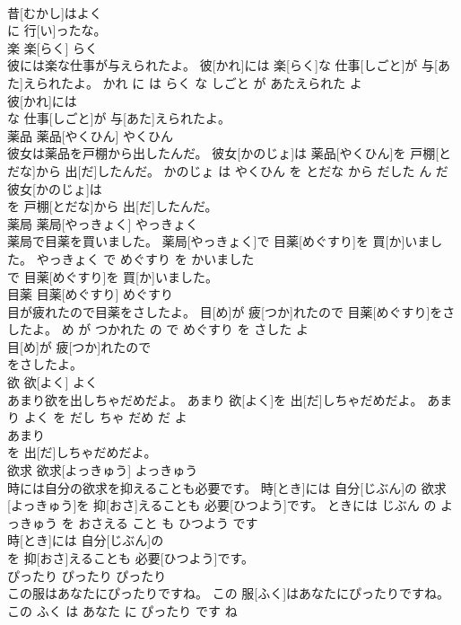 \documentclass[8pt]{extreport}
\begin{document}
\begin{CJK}{UTF8}{min}
\\	昔[むかし]はよく
\\	に 行[い]ったな。			
\\	楽	楽[らく]	らく	
\\	彼には楽な仕事が与えられたよ。	彼[かれ]には 楽[らく]な 仕事[しごと]が 与[あた]えられたよ。	かれ に は らく な しごと が あたえられた よ	
\\	彼[かれ]には
\\	な 仕事[しごと]が 与[あた]えられたよ。			
\\	薬品	薬品[やくひん]	やくひん	
\\	彼女は薬品を戸棚から出したんだ。	彼女[かのじょ]は 薬品[やくひん]を 戸棚[とだな]から 出[だ]したんだ。	かのじょ は やくひん を とだな から だした ん だ	
\\	彼女[かのじょ]は
\\	を 戸棚[とだな]から 出[だ]したんだ。			
\\	薬局	薬局[やっきょく]	やっきょく	
\\	薬局で目薬を買いました。	薬局[やっきょく]で 目薬[めぐすり]を 買[か]いました。	やっきょく で めぐすり を かいました	
\\	で 目薬[めぐすり]を 買[か]いました。			
\\	目薬	目薬[めぐすり]	めぐすり	
\\	目が疲れたので目薬をさしたよ。	目[め]が 疲[つか]れたので 目薬[めぐすり]をさしたよ。	め が つかれた の で めぐすり を さした よ	
\\	目[め]が 疲[つか]れたので
\\	をさしたよ。			
\\	欲	欲[よく]	よく	
\\	あまり欲を出しちゃだめだよ。	あまり 欲[よく]を 出[だ]しちゃだめだよ。	あまり よく を だし ちゃ だめ だ よ	
\\	あまり
\\	を 出[だ]しちゃだめだよ。			
\\	欲求	欲求[よっきゅう]	よっきゅう	
\\	時には自分の欲求を抑えることも必要です。	時[とき]には 自分[じぶん]の 欲求[よっきゅう]を 抑[おさ]えることも 必要[ひつよう]です。	ときには じぶん の よっきゅう を おさえる こと も ひつよう です	
\\	時[とき]には 自分[じぶん]の
\\	を 抑[おさ]えることも 必要[ひつよう]です。			
\\	ぴったり	ぴったり	ぴったり	
\\	この服はあなたにぴったりですね。	この 服[ふく]はあなたにぴったりですね。	この ふく は あなた に ぴったり です ね	

\end{CJK}
\end{document}
